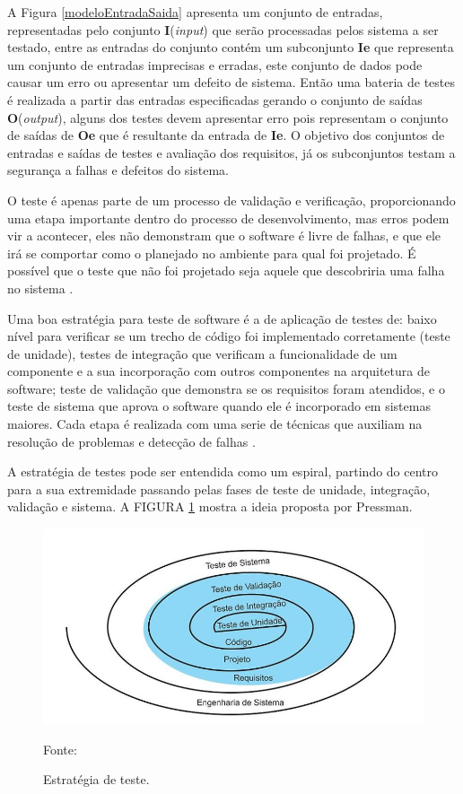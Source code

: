 A Figura \ref{modeloEntradaSaida} apresenta um conjunto de entradas, representadas pelo conjunto \textbf{I}(\textit{input}) que serão processadas pelos sistema a ser testado, entre as entradas do conjunto contém um subconjunto \textbf{Ie} que representa um conjunto de entradas imprecisas e erradas, este conjunto de dados pode causar um erro ou apresentar um defeito de sistema. Então uma bateria de testes é realizada a partir das entradas especificadas gerando o conjunto de saídas \textbf{O}(\textit{output}), alguns dos testes devem apresentar erro pois representam o conjunto de saídas de \textbf{Oe} que é resultante da entrada de \textbf{Ie}. O objetivo dos conjuntos de entradas e saídas de testes e avaliação dos requisitos, já os subconjuntos testam a segurança a falhas e defeitos do sistema.

O teste é apenas parte de um processo de validação e verificação, proporcionando uma etapa importante dentro do processo de desenvolvimento, mas erros podem vir a acontecer, eles não demonstram que o software é livre de falhas, e que ele irá se comportar como o planejado no ambiente para qual foi projetado. É possível que o teste que não foi projetado seja aquele que descobriria uma falha no sistema \cite{SOMMER2011}.

Uma boa estratégia para teste de software é a de aplicação de testes de: baixo nível para verificar se um trecho de código foi implementado corretamente (teste de unidade), testes de integração que verificam a funcionalidade de um componente e a sua incorporação com outros componentes na arquitetura de software; teste de validação que demonstra se os requisitos foram atendidos, e o teste de sistema que aprova o software quando ele é incorporado em sistemas maiores. Cada etapa é realizada com uma serie de técnicas que auxiliam na resolução de problemas e detecção de falhas \cite{PRESMA2016}.

A estratégia de testes pode ser entendida como um espiral, partindo do centro para a sua extremidade passando pelas fases de teste de unidade, integração, validação e sistema. A FIGURA \ref{espiral} mostra a ideia proposta por Pressman.

\begin{figure}[h!]
	\centering
	\includegraphics[scale=0.6]{dados/figuras/espiralPres.JPG}
	\caption{Estratégia de teste.}
	Fonte: \cite[p.~470]{PRESMA2016}
	\label{espiral}
\end{figure}

